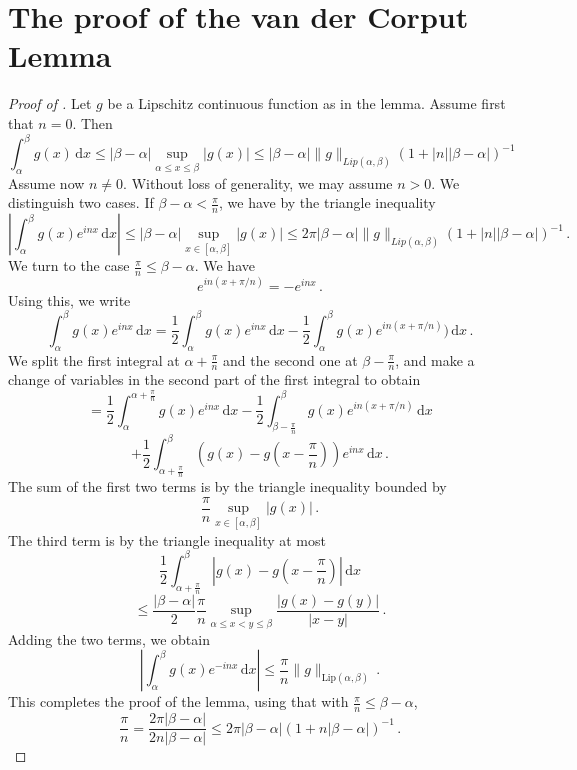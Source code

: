 \section{The proof of the van der Corput Lemma}
\label{10vandercorput}

\begin{proof}[Proof of ]
\leanok
Let $g$ be a Lipschitz continuous function as in the lemma.
Assume first that $n=0$. Then
\begin{equation*}
    \int_\alpha^\beta g(x) \, \mathrm{d}x \le |\beta - \alpha| \sup_{\alpha\le x\le \beta}|g(x)|
    \le |\beta-\alpha|\|g\|_{Lip(\alpha,\beta)}(1+|n||\beta-\alpha|)^{-1}
\end{equation*}
Assume now $n\ne 0$. Without loss of generality, we may assume $n>0$.
We distinguish two cases. If $\beta-\alpha < \frac{\pi}{n}$, we have by the triangle inequality
\begin{equation*}
    \left|\int_\alpha^\beta g(x) e^{inx} \, \mathrm{d}x\right|
    \le |\beta -\alpha| \sup_{x \in [\alpha,\beta]} |g(x)|
    \le 2\pi |\beta-\alpha|\|g\|_{Lip(\alpha,\beta)}(1+|n||\beta-\alpha|)^{-1} \,.
\end{equation*}
We turn to the case $\frac{\pi}{n} \le \beta-\alpha$.
We have
$$
    e^{in(x + \pi/n)} = -e^{inx}\,.
$$
Using this, we write
$$
    \int_\alpha^\beta g(x) e^{inx} \, \mathrm{d}x
    = \frac{1}{2} \int_\alpha^\beta g(x) e^{inx} \, \mathrm{d}x - \frac{1}{2} \int_\alpha^\beta g(x) e^{in(x + \pi/n)}) \, \mathrm{d}x\,.
$$
We split the first integral at $\alpha + \frac{\pi}{n}$ and the second one at $\beta - \frac{\pi}{n}$, and make a change of variables in the second part of the first integral to obtain
$$
    = \frac{1}{2} \int_{\alpha}^{\alpha + \frac{\pi}{n}} g(x) e^{inx} \, \mathrm{d}x - \frac{1}{2} \int_{\beta - \frac{\pi}{n}}^{\beta} g(x) e^{in(x + \pi/n)} \, \mathrm{d}x
$$
$$
    + \frac{1}{2} \int_{\alpha + \frac{\pi}{n}}^{\beta} (g(x) - g(x - \frac{\pi}{n})) e^{inx} \, \mathrm{d}x\,.
$$
The sum of the first two terms is by the triangle inequality bounded by
$$
    \frac{\pi}{n} \sup_{x \in [\alpha,\beta]} |g(x)|\,.
$$
The third term is by the triangle inequality at most
$$
    \frac{1}{2} \int_{\alpha + \frac{\pi}{n}}^\beta |g(x) - g(x - \frac{\pi}{n})| \, \mathrm{d}x
$$
$$
    \le \frac{|\beta-\alpha|}{2} \frac{\pi}{n} \sup_{\alpha \le x < y \le \beta} \frac{|g(x) - g(y)|}{|x-y|}\,.
$$
Adding the two terms, we obtain
$$
    \left|\int_\alpha^\beta g(x) e^{-inx} \, \mathrm{d}x\right| \le \frac{\pi}{n} \|g\|_{\mathrm{Lip}(\alpha,\beta)}\,.
$$
This completes the proof of the lemma, using that with $\frac{\pi}{n} \le \beta-\alpha$,
$$
    \frac{\pi}{n} = \frac{2 \pi |\beta-\alpha|}{2n|\beta-\alpha|} \le 2 \pi |\beta-\alpha|(1 + n|\beta-\alpha|)^{-1}\,.
$$
\end{proof}


